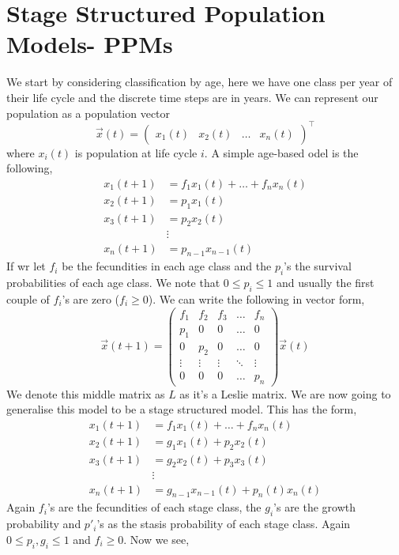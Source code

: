 \section{Stage Structured Population Models- PPMs}
We start by considering classification by age, here we have one class per year of their life cycle and the discrete time steps are in years. We can represent our population as a population vector
$$ \vec x(t) = \begin{pmatrix}
  x_1(t) & x_2(t) & \dots & x_n(t)
\end{pmatrix}^\top $$
where $x_i(t)$ is population at life cycle $i$. A simple age-based odel is the following,
\begin{align*}
  x_1(t+1) &= f_1x_1(t) + \dots + f_nx_n(t) \\
  x_2(t+1) &= p_1x_1(t) \\
  x_3(t+1) &= p_2x_2(t) \\
  & \vdots \\
  x_n(t+1) &= p_{n-1}x_{n-1}(t)
\end{align*}
If wr let $f_i$ be the fecundities in each age class and the $p_i$'s the survival probabilities of each age class. We note that $0 \le p_i \le 1$ and usually the first couple of $f_i$'s are zero ($f_i \ge 0$). We can write the following in vector form,
$$ \vec x(t+1) = \begin{pmatrix}
  f_1 & f_2 & f_3 & \dots & f_n \\
  p_1 & 0 & 0 & \dots & 0 \\
  0 & p_2 & 0 & \dots & 0 \\
  \vdots & \vdots & \vdots & \ddots & \vdots \\
  0 & 0 & 0 & \dots & p_n
\end{pmatrix} \vec x(t)$$
We denote this middle matrix as $L$ as it's a Leslie matrix. We are now going to generalise this model to be a stage structured model. This has the form,
\begin{align*}
  x_1(t+1) &= f_1x_1(t) + \dots + f_nx_n(t) \\
  x_2(t+1) &= g_1x_1(t) + p_2x_2(t) \\
  x_3(t+1) &= g_2x_2(t) + p_3x_3(t) \\
  & \vdots \\
  x_n(t+1) &= g_{n-1}x_{n-1}(t) + p_n(t)x_n(t)
\end{align*}
Again $f_i$'s are the fecundities of each stage class, the $g_i$'s are the growth probability and $p'_i$'s as the stasis probability of each stage class. Again $0 \le p_i, g_i \le 1$ and $f_i \ge 0$. Now we see,
